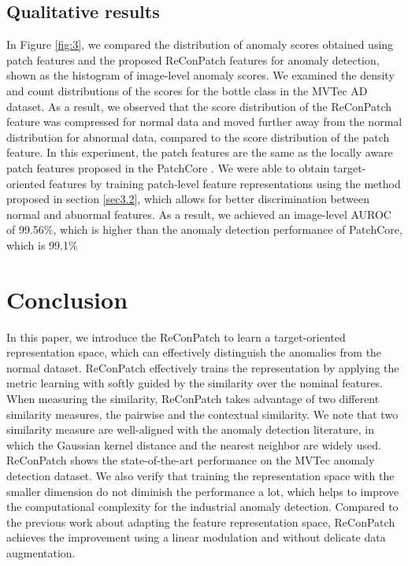 \documentclass[10pt,onecolumn,letterpaper]{article}
\begin{document}
\subsection{Qualitative results}
In Figure \ref{fig:3}, we compared the distribution of anomaly scores obtained using patch features and the proposed ReConPatch features for anomaly detection, shown as the histogram of image-level anomaly scores. We examined the density and count distributions of the scores for the bottle class in the MVTec AD \cite{bergmann2019mvtec} dataset.
As a result, we observed that the score distribution of the ReConPatch feature was compressed for normal data and moved further away from the normal distribution for abnormal data, compared to the score distribution of the patch feature.
In this experiment, the patch features are the same as the locally aware patch features proposed in the PatchCore \cite{roth2022towards}. We were able to obtain target-oriented features by training patch-level feature representations using the method proposed in section \ref{sec3.2}, which allows for better discrimination between normal and abnormal features. As a result, we achieved an image-level AUROC of 99.56\%, which is higher than the anomaly detection performance of PatchCore, which is 99.1\%



\section{Conclusion}
In this paper, we introduce the ReConPatch to learn a target-oriented representation space, which can effectively distinguish the anomalies from the normal dataset. ReConPatch effectively trains the representation by applying the metric learning with softly guided by the similarity over the nominal features. When measuring the similarity, ReConPatch takes advantage of two different similarity measures, the pairwise and the contextual similarity.
We note that two similarity measure are well-aligned with the anomaly detection literature, in which the Gaussian kernel distance and the nearest neighbor are widely used.
ReConPatch shows the state-of-the-art performance on the MVTec anomaly detection dataset. We also verify that training the representation space with the smaller dimension do not diminish the performance a lot, which helps to improve the computational complexity for the industrial anomaly detection. Compared to the previous work about adapting the feature representation space, ReConPatch achieves the improvement using a linear modulation and without delicate data augmentation.

\newpage
{\small


}
\end{document}
